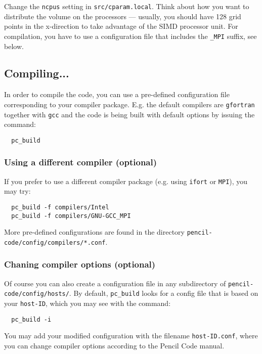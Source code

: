 \documentclass[a4paper,12pt]{article}
\begin{document}
Change the \verb|ncpus| setting in \verb|src/cparam.local|.
Think about how you want to distribute the volume on the processors --- usually, you should have 128 grid points in the x-direction to take advantage of the SIMD processor unit.
For compilation, you have to use a configuration file that includes the \verb|_MPI| suffix, see below.

\subsection{Compiling...}

In order to compile the code, you can use a pre-defined configuration file corresponding to your compiler package.
E.g. the default compilers are \verb|gfortran| together with \verb|gcc| and the code is being built with default options by issuing the command:

\begin{verbatim}
  pc_build
\end{verbatim}

\subsubsection{Using a different compiler (optional)}

If you prefer to use a different compiler package (e.g. using \verb|ifort| or \verb|MPI|), you may try:

\begin{verbatim}
  pc_build -f compilers/Intel
  pc_build -f compilers/GNU-GCC_MPI
\end{verbatim}

More pre-defined configurations are found in the directory \verb|pencil-code/config/compilers/*.conf|.

\subsubsection{Chaning compiler options (optional)}

Of course you can also create a configuration file in any subdirectory of \verb|pencil-code/config/hosts/|.
By default, \verb|pc_build| looks for a config file that is based on your \verb|host-ID|, which you may see with the command:
\begin{verbatim}
  pc_build -i
\end{verbatim}
You may add your modified configuration with the filename \verb|host-ID.conf|, where you can change compiler options according to the Pencil Code manual.
\end{document}
